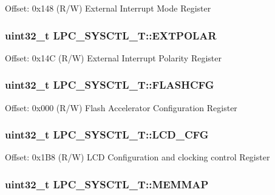 Offset\-: 0x148 (R/\-W) External Interrupt Mode Register \hypertarget{structLPC__SYSCTL__T_a7d0423c5e3f7482182c229bbc4b2b83b}{
\subsubsection[{E\-X\-T\-P\-O\-L\-A\-R}]{ uint32\-\_\-t L\-P\-C\-\_\-\-S\-Y\-S\-C\-T\-L\-\_\-\-T\-::\-E\-X\-T\-P\-O\-L\-A\-R}}\label{structLPC__SYSCTL__T_a7d0423c5e3f7482182c229bbc4b2b83b}
Offset\-: 0x14\-C (R/\-W) External Interrupt Polarity Register \hypertarget{structLPC__SYSCTL__T_a8dcbc2e1c89d7bd42dbd19f66e2ddd8e}{
\subsubsection[{F\-L\-A\-S\-H\-C\-F\-G}]{ uint32\-\_\-t L\-P\-C\-\_\-\-S\-Y\-S\-C\-T\-L\-\_\-\-T\-::\-F\-L\-A\-S\-H\-C\-F\-G}}\label{structLPC__SYSCTL__T_a8dcbc2e1c89d7bd42dbd19f66e2ddd8e}
Offset\-: 0x000 (R/\-W) Flash Accelerator Configuration Register \hypertarget{structLPC__SYSCTL__T_aef5d629c590fd35e8da2e061ddcdf17e}{
\subsubsection[{L\-C\-D\-\_\-\-C\-F\-G}]{ uint32\-\_\-t L\-P\-C\-\_\-\-S\-Y\-S\-C\-T\-L\-\_\-\-T\-::\-L\-C\-D\-\_\-\-C\-F\-G}}\label{structLPC__SYSCTL__T_aef5d629c590fd35e8da2e061ddcdf17e}
Offset\-: 0x1\-B8 (R/\-W) L\-C\-D Configuration and clocking control Register \hypertarget{structLPC__SYSCTL__T_a5a5d2dc160a256a110878af0c2757a64}{
\subsubsection[{M\-E\-M\-M\-A\-P}]{ uint32\-\_\-t L\-P\-C\-\_\-\-S\-Y\-S\-C\-T\-L\-\_\-\-T\-::\-M\-E\-M\-M\-A\-P}}\label{structLPC__SYSCTL__T_a5a5d2dc160a256a110878af0c2757a64}
